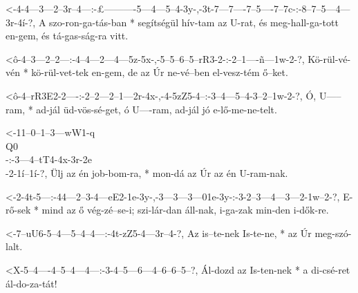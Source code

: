   {<-4-4---3---2--3r--4---:-£----------5---4---5--4-3y-,-3t-7---7----7--5----7--7c-:-8--7--5---4---3r-4í-?,}
  {  A szo-ron-ga-tás-ban * segítségül hív-tam az U-rat, és meg-hall-ga-tott en-gem, és tá-gas-ság-ra vitt.}

  {<ô-4--3---2--2---:-4--4---2---4---5z-5x-,-5--5--6--5--rR3-2-:-2--1----ñ---1w-2-?,}
  {   Kö-rül-vé-vén * kö-rül-vet-tek en-gem, de az Úr ne-vé--ben el-vesz-tém ő--ket.}

  {<ô-4--rR3E2-2----:-2--2---2--1---2r-4x-,-4-5zZ5-4--:-3--4---5--4-3--2--1w-2-?,}
  {   Ó, U-----ram, * ad-jál üd-vös-sé-get, ó U----ram, ad-jál jó e-lő-me-ne-telt.}


  {<-11--0--1--3---wW1-q\\Q0\\-:-3---4--tT4-4x-3r-2e\\-2-1í--1í-?,}
  {  Ülj az én job-bom-ra,     * mon-dá az  Úr az én   U-ram-nak.}

  {<-2-4t-5---:-44---2--3-4---eE2-1e-3y-,-3---3---3---01e-3y-:-3-2--3---4---3---2-1w--2-?,}
  {  E-rő-sek * mind az ő vég-zé--se-i;   szi-lár-dan áll-nak, i-ga-zak min-den i-dők-re.}




  {<-7--uU6-5--4---5--4--4---:-4t-zZ5-4---3r--4-?,}
  {  Az is--te-nek Is-te-ne, * az Úr  meg-szó-lalt.}

  {<X-5--4----4--5--4---4---:-3-4--5---6---4--6--6--5--?,}
  {   Ál-dozd az Is-ten-nek * a di-csé-ret ál-do-za-tát!}

